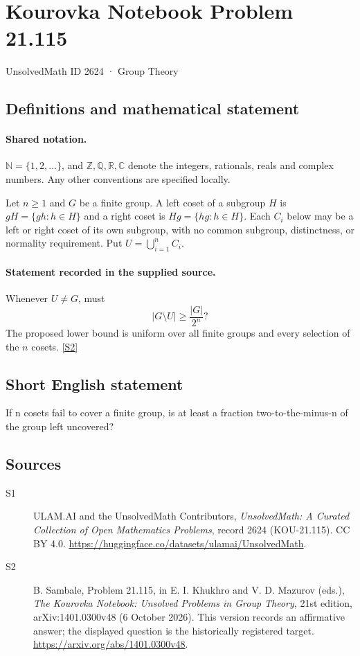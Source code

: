 \documentclass[11pt]{article}
\newcommand{\sref}[2]{\hyperlink{source:#1:#2}{[S#2]}}
\begin{document}
\setcounter{section}{2623}
\section{Kourovka Notebook Problem 21.115}\label{2624}
{\small\sffamily UnsolvedMath ID 2624 · Group Theory}
\subsection{Definitions and mathematical statement}

\paragraph{Shared notation.}$\mathbb N=\{1,2,\ldots\}$, and $\mathbb Z,\mathbb Q,\mathbb R,\mathbb C$ denote the integers, rationals, reals and complex numbers. Any other conventions are specified locally.


Let $n\geq1$ and $G$ be a finite group. A left coset of a subgroup $H$ is $gH=\{gh:h\in H\}$ and a right coset is $Hg=\{hg:h\in H\}$. Each $C_i$ below may be a left or right coset of its own subgroup, with no common subgroup, distinctness, or normality requirement. Put $U=\bigcup_{i=1}^n C_i$.
\paragraph{Statement recorded in the supplied source.}
Whenever $U\ne G$, must
\[
 |G\setminus U|\geq\frac{|G|}{2^n}?
\]
The proposed lower bound is uniform over all finite groups and every selection of the $n$ cosets. \sref{2624}{2}
\subsection{Short English statement}
If n cosets fail to cover a finite group, is at least a fraction two-to-the-minus-n of the group left uncovered?
\subsection{Sources}
\begin{description}
\item[\hypertarget{source:2624:1}{S1}] ULAM.AI and the UnsolvedMath Contributors, \emph{UnsolvedMath: A Curated Collection of Open Mathematics Problems}, record 2624 (KOU-21.115). CC BY 4.0. \url{https://huggingface.co/datasets/ulamai/UnsolvedMath}.
\item[\hypertarget{source:2624:2}{S2}] B. Sambale, Problem 21.115, in E. I. Khukhro and V. D. Mazurov (eds.), \emph{The Kourovka Notebook: Unsolved Problems in Group Theory}, 21st edition, arXiv:1401.0300v48 (6 October 2026). This version records an affirmative answer; the displayed question is the historically registered target. \url{https://arxiv.org/abs/1401.0300v48}.
\end{description}
\label{end:2624}
\end{document}
